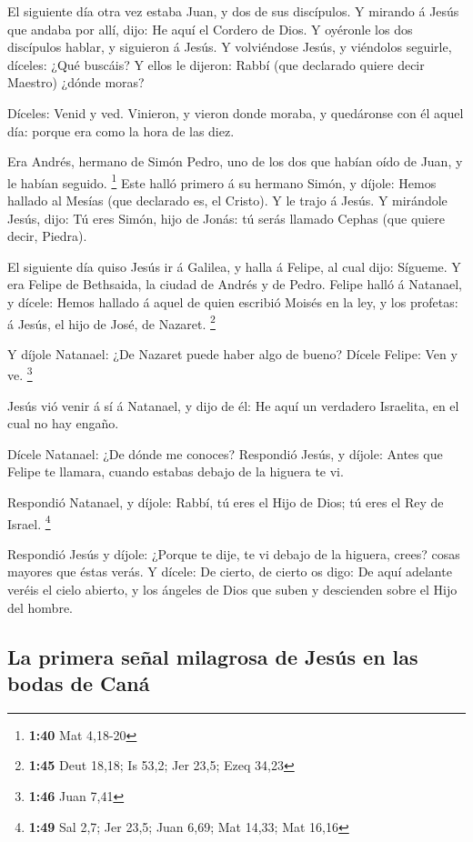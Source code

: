  El siguiente día otra vez estaba Juan, y dos de sus
discípulos.  Y mirando á Jesús que andaba por allí, dijo:
He aquí el Cordero de Dios.  Y oyéronle los dos discípulos
hablar, y siguieron á Jesús.  Y volviéndose Jesús, y
viéndolos seguirle, díceles: ¿Qué buscáis? Y ellos le dijeron: Rabbí
(que declarado quiere decir Maestro) ¿dónde moras?

 Díceles: Venid y ved. Vinieron, y vieron donde moraba, y
quedáronse con él aquel día: porque era como la hora de las diez.

 Era Andrés, hermano de Simón Pedro, uno de los dos que
habían oído de Juan, y le habían seguido. \footnote{\textbf{1:40} Mat
  4,18-20}  Este halló primero á su hermano Simón, y
díjole: Hemos hallado al Mesías (que declarado es, el Cristo).
 Y le trajo á Jesús. Y mirándole Jesús, dijo: Tú eres
Simón, hijo de Jonás: tú serás llamado Cephas (que quiere decir,
Piedra).

 El siguiente día quiso Jesús ir á Galilea, y halla á
Felipe, al cual dijo: Sígueme.  Y era Felipe de Bethsaida,
la ciudad de Andrés y de Pedro.  Felipe halló á Natanael, y
dícele: Hemos hallado á aquel de quien escribió Moisés en la ley, y los
profetas: á Jesús, el hijo de José, de Nazaret. \footnote{\textbf{1:45}
  Deut 18,18; Is 53,2; Jer 23,5; Ezeq 34,23}

 Y díjole Natanael: ¿De Nazaret puede haber algo de bueno?
Dícele Felipe: Ven y ve. \footnote{\textbf{1:46} Juan 7,41}

 Jesús vió venir á sí á Natanael, y dijo de él: He aquí un
verdadero Israelita, en el cual no hay engaño.

 Dícele Natanael: ¿De dónde me conoces? Respondió Jesús, y
díjole: Antes que Felipe te llamara, cuando estabas debajo de la higuera
te vi.

 Respondió Natanael, y díjole: Rabbí, tú eres el Hijo de
Dios; tú eres el Rey de Israel. \footnote{\textbf{1:49} Sal 2,7; Jer
  23,5; Juan 6,69; Mat 14,33; Mat 16,16}

 Respondió Jesús y díjole: ¿Porque te dije, te vi debajo de
la higuera, crees? cosas mayores que éstas verás.  Y
dícele: De cierto, de cierto os digo: De aquí adelante veréis el cielo
abierto, y los ángeles de Dios que suben y descienden sobre el Hijo del
hombre.

\hypertarget{la-primera-seuxf1al-milagrosa-de-jesuxfas-en-las-bodas-de-canuxe1}{%
\subsection{La primera señal milagrosa de Jesús en las bodas de
Caná}\label{la-primera-seuxf1al-milagrosa-de-jesuxfas-en-las-bodas-de-canuxe1}}

